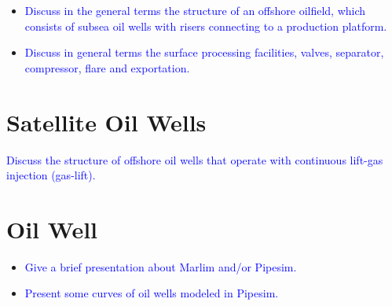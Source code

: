 \begin{itemize}

\item \textcolor{blue}{Discuss in the general terms the structure of an offshore oilfield, which consists of subsea oil wells with risers connecting to a production platform.}

\item \textcolor{blue}{Discuss in general terms the surface processing facilities, valves, separator, compressor, flare and exportation.}

\end{itemize}


\section{Satellite Oil Wells}

\textcolor{blue}{Discuss the structure of offshore oil wells that operate with continuous lift-gas injection (gas-lift).}



\section{Oil Well}


\begin{itemize}

\item \textcolor{blue}{Give a brief presentation about Marlim and/or Pipesim.}

\item \textcolor{blue}{Present some curves of oil wells modeled in Pipesim.}


\end{itemize}
